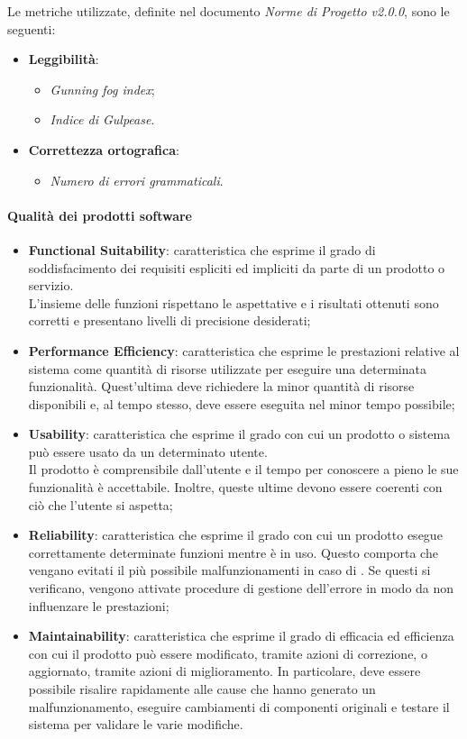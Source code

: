 Le metriche utilizzate, definite nel documento \emph{Norme di Progetto v2.0.0}, sono le seguenti:

\begin{itemize}
	\item{\textbf{Leggibilità}:
		\begin{itemize}
			\item{\emph{Gunning fog index};}
			\item{\emph{Indice di Gulpease}.}
		\end{itemize}	
	}
	\item{\textbf{Correttezza ortografica}:
		\begin{itemize}
			\item{\emph{Numero di errori grammaticali}.}
		\end{itemize}	
	}
\end{itemize}

\paragraph{Qualità dei prodotti software}

\begin{itemize}
		\item{\textbf{Functional Suitability}: caratteristica che esprime il grado di soddisfacimento dei requisiti espliciti ed impliciti da parte di un prodotto o servizio.\\ L'insieme delle funzioni rispettano le aspettative e i risultati ottenuti sono corretti e presentano livelli di precisione desiderati;
	}
		\item{\textbf{Performance Efficiency}: 		caratteristica che esprime le prestazioni relative al sistema come quantità di risorse utilizzate per eseguire una determinata funzionalità. Quest'ultima deve richiedere la minor quantità di risorse disponibili e, al tempo stesso, deve essere eseguita nel minor tempo possibile; 
	}
		\item{\textbf{Usability}: caratteristica che esprime il grado con cui un prodotto o sistema può essere usato da un determinato utente. \\ Il prodotto è comprensibile dall'utente e il tempo per conoscere a pieno le sue funzionalità è accettabile. Inoltre, queste ultime devono essere coerenti con ciò che l'utente si aspetta;
	}
		\item{\textbf{Reliability}: caratteristica che esprime il grado con cui un prodotto esegue correttamente determinate funzioni  mentre è in uso. Questo comporta che vengano evitati il più possibile malfunzionamenti in caso di . Se questi si verificano, vengono attivate procedure di gestione dell'errore in modo da non influenzare le prestazioni;
	}
	\item{\textbf{Maintainability}: caratteristica che esprime il grado di efficacia ed efficienza con cui il prodotto può essere modificato, tramite azioni di correzione, o aggiornato, tramite azioni di miglioramento. In particolare, deve essere possibile risalire rapidamente alle cause che hanno generato un malfunzionamento, eseguire cambiamenti di componenti originali e testare il sistema per validare le varie modifiche.
	}
\end{itemize}

